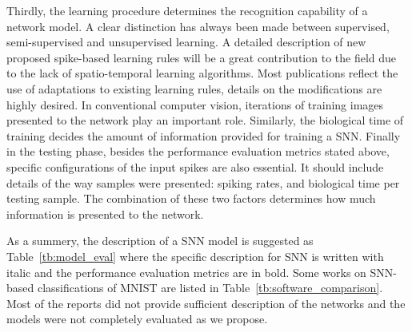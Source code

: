 \documentclass{frontiersENG} %
\begin{document}
Thirdly, the learning procedure determines the recognition capability of a network model.
A clear distinction has always been made between supervised, semi-supervised and unsupervised learning.
A detailed description of new proposed spike-based learning rules will be a great contribution to the field due to the lack of spatio-temporal learning algorithms.
Most publications reflect the use of adaptations to existing learning rules, details on the modifications are highly desired.
In conventional computer vision, iterations of training images presented to the network play an important role.
Similarly, the biological time of training decides the amount of information provided for training a SNN.
Finally in the testing phase, besides the performance evaluation metrics stated above, specific configurations of the input spikes are also essential.
It should include details of the way samples were presented: spiking rates, and biological time per testing sample.
The combination of these two factors determines how much information is presented to the network.

As a summery, the description of a SNN model is suggested as Table~\ref{tb:model_eval} where the specific description for SNN is written with italic and the performance evaluation metrics are in bold.
Some works on SNN-based classifications of MNIST are listed in Table~\ref{tb:software_comparison}.
Most of the reports did not provide sufficient description of the networks and the models were not completely evaluated as we propose.
\end{document}
